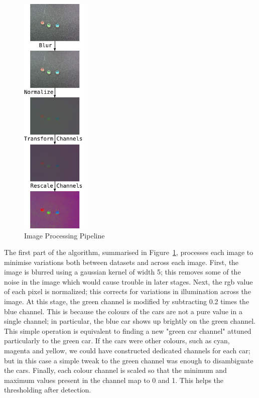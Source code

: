 \documentclass{article}
\begin{document}
\begin{figure}[htbp!] 
  \centering
    \includegraphics[width=0.3\textwidth]{../Drawings/processing.pdf}
    \caption{Image Processing Pipeline}
    \label{fig:processing}
\end{figure}

The first part of the algorithm, summarised in Figure~\ref{fig:processing}, processes each image to minimise variations both between datasets and across each image. First, the image is blurred using a gaussian kernel of width 5; this removes some of the noise in the image which would cause trouble in later stages. Next, the rgb value of each pixel is normalized; this corrects for variations in illumination across the image. At this stage, the green channel is modified by subtracting 0.2 times the blue channel. This is because the colours of the cars are not a pure value in a single channel; in particular, the blue car shows up brightly on the green channel. This simple operation is equivalent to finding a new "green car channel" attuned particularly to the green car. If the cars were other colours, such as cyan, magenta and yellow, we could have constructed dedicated channels for each car; but in this case a simple tweak to the green channel was enough to disambiguate the cars. Finally, each colour channel is scaled so that the minimum and maximum values present in the channel map to 0 and 1. This helps the thresholding after detection.
\end{document}
